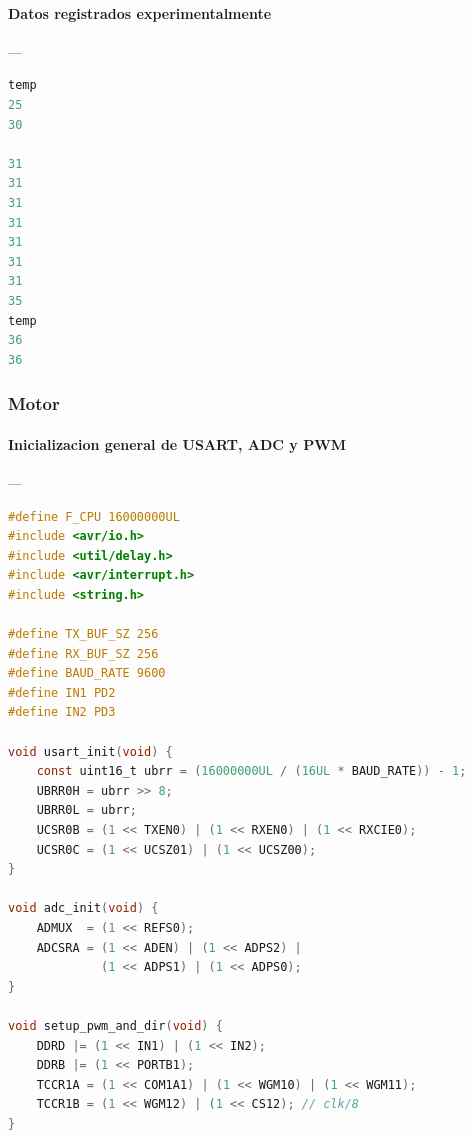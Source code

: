\paragraph{Datos registrados experimentalmente}\label{anexo:T8_datos_txt}---\\
\begin{lstlisting}[language=python, caption={Fragmento del archivo de datos utilizados para la simulacion.}]
temp
25 
30

31
31
31
31
31
31
31
35
temp
36
36
\end{lstlisting}





\subsubsection{Motor}

\paragraph{Inicializacion general de USART, ADC y PWM}\label{anexo:M1_init_usart_adc_pwm}---\\
\begin{lstlisting}[language=C, caption={Inicializacion de perifericos USART, ADC y PWM para el control de motor.}]
#define F_CPU 16000000UL
#include <avr/io.h>
#include <util/delay.h>
#include <avr/interrupt.h>
#include <string.h>

#define TX_BUF_SZ 256
#define RX_BUF_SZ 256
#define BAUD_RATE 9600
#define IN1 PD2
#define IN2 PD3

void usart_init(void) {
    const uint16_t ubrr = (16000000UL / (16UL * BAUD_RATE)) - 1;
    UBRR0H = ubrr >> 8;
    UBRR0L = ubrr;
    UCSR0B = (1 << TXEN0) | (1 << RXEN0) | (1 << RXCIE0);
    UCSR0C = (1 << UCSZ01) | (1 << UCSZ00);
}

void adc_init(void) {
    ADMUX  = (1 << REFS0);                        
    ADCSRA = (1 << ADEN) | (1 << ADPS2) |
             (1 << ADPS1) | (1 << ADPS0);          
}

void setup_pwm_and_dir(void) {
    DDRD |= (1 << IN1) | (1 << IN2);
    DDRB |= (1 << PORTB1);
    TCCR1A = (1 << COM1A1) | (1 << WGM10) | (1 << WGM11);
    TCCR1B = (1 << WGM12) | (1 << CS12); // clk/8
}
\end{lstlisting}

